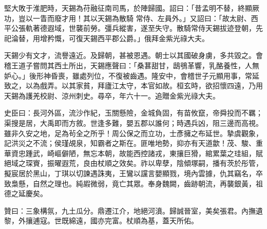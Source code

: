 \begin{pinyinscope}
 堅大敗于淮肥時，天錫為苻融征南司馬，於陣歸國。詔曰：「昔孟明不替，終顯厥功，豈以一眚而廢才用！其以天錫為散騎
 常侍、左員外。」又詔曰：「故太尉、西平公張軌著德遐域，世襲前勞。彊兵縱害，遂至失守。散騎常侍天錫拔迹登朝，先祀淪替，用增矜慨，可復天錫西平郡公爵。」俄拜金紫光祿大夫。



 天錫少有文才，流譽遠近。及歸朝，甚被恩遇。朝士以其國破身虜，多共毀之。會稽王道子嘗問其西土所出，天錫應聲曰：「桑葚甜甘，鴟鴞革響，乳酪養性，人無妒心。」後形神昏喪，雖處列位，不復被齒遇。隆安中，會稽世子元顯用事，常延致之，以為戲弄。以其家貧，拜廬江太守，本官如故。桓玄時，欲招懷四遠，乃用天錫為護羌校尉、涼州刺史。尋卒，年六十一。追贈金紫光祿大夫。



 史臣曰：長河外區，流沙作紀，玉關懸險，金城負固，有苗攸竄，帝舜投而不羈；渠搜是居，大禹即而方敘。世逢多難，嬰五郡以誰何；時遇兵凶，阻三邊而高視。雖非久安之地，足為茍全之所乎！周公保之而立功，士彥擁之布延世。摯虞觀象，記洪災之不流；侯瑾覘泉，知霸者之斯在。匪唯地勢，抑亦有天道歙！茂、駿、重華資忠踵武，崎嶇僻陋，無忘本朝，故能西控諸戎，東攘巨猾，綰累葉之珪組，賦絕域之琛賨，振曜遐荒，良由杖順之效矣。祚以卑孽，陰傾塚嗣，播有茨於彤管，擬宸居於黑山，丁琪以切諫遇誅夷，王鸞以讜言嬰顯戮，境內雲據，仇其竊名，卒
 致梟懸，自然之理也。純嘏微弱，竟亡其眾。奉身魏闕，齒跡朝流，再襲銀黃，祖德之延慶矣。



 贊曰：三象構氛，九土瓜分。鼎遷江介，地絕河濆。歸誠晉室，美矣張君。內撫遺黎，外攘逋寇。世既綿遠，國亦完富。杖順為基，蓋天所佑。



\end{pinyinscope}